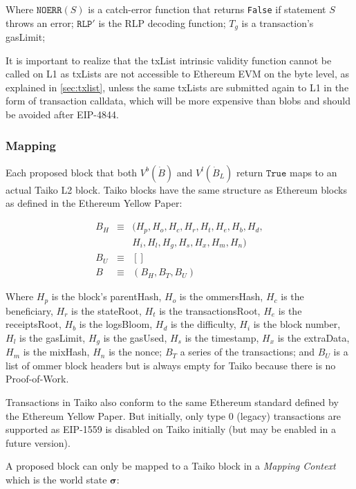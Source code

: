 \documentclass[9pt,oneside]{amsart}
\begin{document}
\begin{multicols}{2}
Where $\texttt{NOERR}(S)$ is a catch-error function that returns \texttt{False} if statement $S$ throws an error; $\texttt{RLP}'$ is the RLP decoding function;  $T_g$ is a transaction's gasLimit; 


It is important to realize that the txList intrinsic validity function cannot be called on L1 as txLists are not accessible to Ethereum EVM on the byte level, as explained in \ref{sec:txlist}, unless the same txLists are submitted again to L1 in the form of transaction calldata, which will be more expensive than blobs and should be avoided after EIP-4844.

\subsubsection{Mapping}

Each proposed block that both $V^b(\dot{B})$ and $V^l(\dot{B}_L)$ return $\texttt{True}$ maps to an actual Taiko L2 block. Taiko blocks have the same structure as Ethereum blocks as defined in the Ethereum Yellow Paper\cite{ethyellowpaper}:

\begin{eqnarray}
B_H & \equiv & (H_p, H_o, H_c, H_r, H_t, H_e, H_b, H_d, \\
\nonumber & & H_i, H_l,H_g, H_s, H_x, H_m, H_n) \\
B_U  & \equiv & [] \\
B & \equiv & (B_H, B_T, B_U)
\end{eqnarray}

Where $H_p$ is the block's parentHash, $H_o$ is the ommersHash, $H_c$ is the beneficiary, $H_r$ is the stateRoot, $H_t$ is the transactionsRoot, $H_e$ is the receiptsRoot, $H_b$ is the logsBloom, $H_d$ is the difficulty, $H_i$ is the block number, $H_l$ is the gasLimit, $H_g$ is the gasUsed, $H_s$ is the timestamp, $H_x$ is the extraData, $H_m$ is the mixHash, $H_n$ is the nonce; $B_T$ a series of the transactions; and $B_U$ is a list of ommer block headers but is always empty for Taiko because there is no Proof-of-Work.

Transactions in Taiko also conform to the same Ethereum standard defined by the Ethereum Yellow Paper. But initially, only type 0 (legacy)  transactions are supported as EIP-1559 is disabled on Taiko initially (but may be enabled in a future version).

A proposed block can only be mapped to a Taiko block in a \textit{Mapping Context} which is the world state $\boldsymbol{\sigma}$:


\end{multicols}
\end{document}
